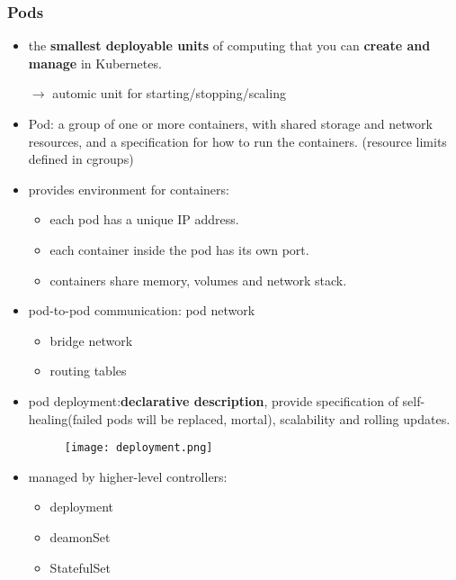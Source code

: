 \subsubsection{Pods}
\begin{itemize}
	\item the \textbf{smallest deployable units} of computing that you can \textbf{create and manage} in Kubernetes.
	
	$\rightarrow$ automic unit for starting/stopping/scaling
	
	
	\item Pod: a group of one or more containers, with shared storage and network resources, and a specification for how to run the containers. (resource limits defined in cgroups)
	\item provides environment for containers:
	\begin{itemize}
		\item each pod has a unique IP address.  
		\item each container inside the pod has its own port. 
		\item containers share memory, volumes and network stack. 
	\end{itemize}
	\item pod-to-pod communication: pod network
	\begin{itemize}
		\item bridge network
		\item routing tables
	\end{itemize}
	\item pod deployment:\textbf{declarative description}, provide specification of self-healing(failed pods will be replaced, mortal), scalability and rolling updates. 
	\begin{figure}[H]
			\centering
			\texttt{[image: deployment.png]}
	\end{figure}
	\item managed by higher-level controllers:
	\begin{itemize}
		\item deployment
		\item deamonSet
		\item StatefulSet
	\end{itemize}
	
\end{itemize}

